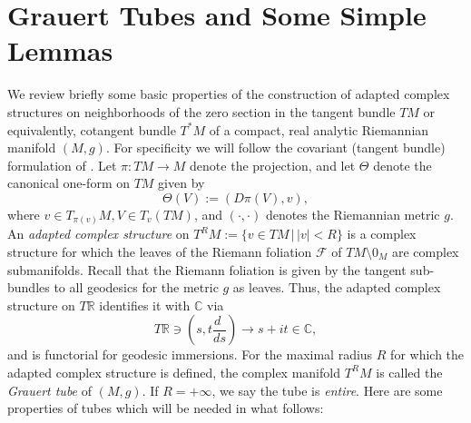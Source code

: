 \documentclass[12pt,reqno]{amsart}\usepackage{amssymb,amsmath,amscd,epsfig,amsthm,enumerate,import,eufrak}
\theoremstyle{definition}
\theoremstyle{remark}
\numberwithin{equation}{section}
\theoremstyle{plain}
\theoremstyle{definition}
\def \r {\mathbb{R}}
\def \c {\mathbb{C}}
\def \vs {\vskip 2mm}
\theoremstyle{remark}
\numberwithin{theorem}{section}
\begin{document}
\vs\vs
%
%
%
%
%
%
%
%
%
%
%
%
\section{Grauert Tubes and Some Simple Lemmas}\label{sec:GTlemmas}
\vs\vs
We review briefly some basic properties of the construction of adapted complex structures on neighborhoods of the zero section in the tangent bundle $TM$ \cite{ls,s} or equivalently, cotangent bundle $T^*M$ \cite{gs1, gs2} of a compact, real analytic Riemannian manifold $(M, g)$. For specificity we will follow the covariant (tangent bundle) formulation of \cite{ls,s}.
\vs
Let $\pi: TM \to M$ denote the projection, and let $\Theta$ denote the canonical one-form on $TM$ given by 
%
\[
	\Theta(V) := (D\pi(V), v),
\]
%	
where $v \in T_{\pi(v)}M, V \in T_v(TM)$, and $(\cdot,\cdot)$ denotes the Riemannian metric $g$. An {\em adapted complex structure} on $T^RM := \{v \in TM \, | \, |v| < R\}$ is a complex structure for which the leaves of the Riemann foliation $\mathcal{F}$ of $TM \setminus 0_M$ are complex submanifolds. Recall that the Riemann foliation is given by the tangent sub-bundles to all geodesics for the metric $g$ as leaves. Thus, the adapted complex structure on $T\r$ identifies it with $\c$ via 
%
\[
	T\r \ni (s, t \frac{d\,\,}{ds}) \to s+ i t \in \c,
\]
% 
and is functorial for geodesic immersions. 
\vs
For the maximal radius $R$ for which the adapted complex structure is defined, the complex manifold $T^RM$ is called the {\em Grauert tube} of $(M, g)$. If $R = +\infty$, we say the tube is {\em entire}.  
\vs
Here are some properties of tubes which will be needed in what follows:
\vs
\end{document}
